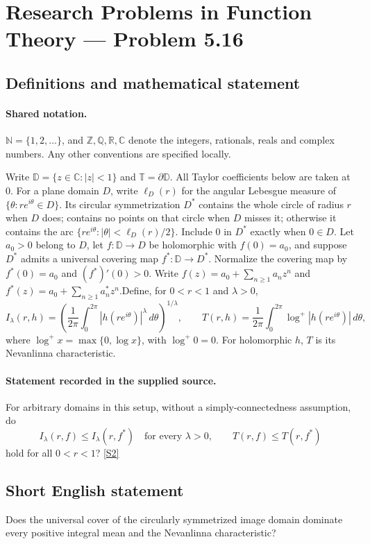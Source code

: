 \documentclass[11pt]{article}
\newcommand{\sref}[2]{\hyperlink{source:#1:#2}{[S#2]}}
\begin{document}
\section{Research Problems in Function Theory — Problem 5.16}\label{statement}

\subsection{Definitions and mathematical statement}

\paragraph{Shared notation.}$\mathbb N=\{1,2,\ldots\}$, and $\mathbb Z,\mathbb Q,\mathbb R,\mathbb C$ denote the integers, rationals, reals and complex numbers. Any other conventions are specified locally.


Write $\mathbb D=\{z\in\mathbb C:|z|<1\}$ and $\mathbb T=\partial\mathbb D$. All Taylor coefficients below are taken at $0$. For a plane domain $D$, write $\ell_D(r)$ for the angular Lebesgue measure of $\{\theta:re^{i\theta}\in D\}$. Its circular symmetrization $D^*$ contains the whole circle of radius $r$ when $D$ does; contains no points on that circle when $D$ misses it; otherwise it contains the arc $\{re^{i\theta}:|\theta|<\ell_D(r)/2\}$. Include $0$ in $D^*$ exactly when $0\in D$. Let $a_0>0$ belong to $D$, let $f:\mathbb D\to D$ be holomorphic with $f(0)=a_0$, and suppose $D^*$ admits a universal covering map $f^*:\mathbb D\to D^*$. Normalize the covering map by $f^*(0)=a_0$ and $(f^*)'(0)>0$. Write $f(z)=a_0+\sum_{n\ge1}a_nz^n$ and $f^*(z)=a_0+\sum_{n\ge1}a_n^*z^n$.Define, for $0<r<1$ and $\lambda>0$,
\[I_\lambda(r,h)=\left(\frac1{2\pi}\int_0^{2\pi}|h(re^{i\theta})|^\lambda\,d\theta\right)^{1/\lambda},\qquad
T(r,h)=\frac1{2\pi}\int_0^{2\pi}\log^+|h(re^{i\theta})|\,d\theta,\]
where $\log^+x=\max\{0,\log x\}$, with $\log^+0=0$. For holomorphic $h$, $T$ is its Nevanlinna characteristic.
\paragraph{Statement recorded in the supplied source.}
For arbitrary domains in this setup, without a simply-connectedness assumption, do
\[I_\lambda(r,f)\le I_\lambda(r,f^*)\quad\text{for every }\lambda>0,\qquad
T(r,f)\le T(r,f^*)\]
hold for all $0<r<1$? \sref{statement}{2}
\subsection{Short English statement}
Does the universal cover of the circularly symmetrized image domain dominate every positive integral mean and the Nevanlinna characteristic?
\end{document}
